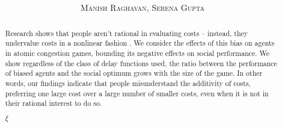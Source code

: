 \documentclass[twoside]{article}
\title{\vspace{-15mm}\fontsize{24pt}{10pt}\selectfont\textbf{\titlee}} %
\author{
\large
\textsc{Manish Raghavan, Serena Gupta}
\vspace{-5mm}
}
\begin{document}
\maketitle %

\thispagestyle{fancy} %

\begin{abstract}

  Research shows that people aren't rational in evaluating costs -- instead,
  they undervalue costs in a nonlinear fashion
  \cite{Kahneman1979}. We consider the effects of this bias on agents in atomic congestion
  games, bounding its negative effects on social performance. We show regardless
  of the class of delay functions used, the ratio between the performance of
  biased agents and the social optimum grows with the size of the game. In other words, our findings indicate that people misunderstand the additivity of
  costs, preferring one large cost over a large number of smaller costs, even
  when it is not in their rational interest to do so.

$\xi$

\end{abstract}
\end{document}
